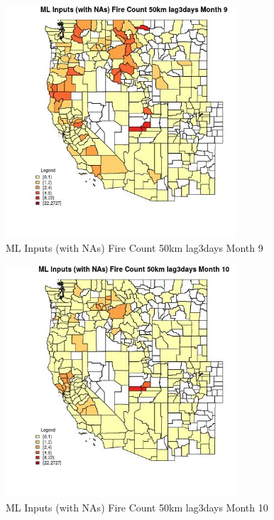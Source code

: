 \begin{figure} 
\centering  
\includegraphics[width=0.77\textwidth]{Code_Outputs/Report_ML_input_PM25_Step4_part_f_de_duplicated_aveswNAs_CountyFire_Count_50km_lag3daysmedianMonth9.jpg} 
\caption{\label{fig:Report_ML_input_PM25_Step4_part_f_de_duplicated_aveswNAsCountyFire_Count_50km_lag3daysmedianMonth9}ML Inputs (with NAs) Fire Count 50km lag3days Month 9} 
\end{figure} 
 

\begin{figure} 
\centering  
\includegraphics[width=0.77\textwidth]{Code_Outputs/Report_ML_input_PM25_Step4_part_f_de_duplicated_aveswNAs_CountyFire_Count_50km_lag3daysmedianMonth10.jpg} 
\caption{\label{fig:Report_ML_input_PM25_Step4_part_f_de_duplicated_aveswNAsCountyFire_Count_50km_lag3daysmedianMonth10}ML Inputs (with NAs) Fire Count 50km lag3days Month 10} 
\end{figure} 
 

